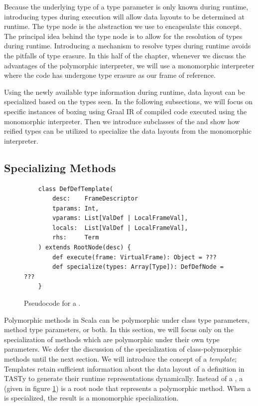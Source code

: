 Because the underlying type of a type parameter is only known during runtime, introducing types during execution will allow data layouts to be determined at runtime.
The type node is the abstraction we use to encapsulate this concept.
The principal idea behind the type node is to allow for the resolution of types during runtime.
Introducing a mechanism to resolve types during runtime avoids the pitfalls of type erasure.
In this half of the chapter, whenever we discuss the advantages of the polymorphic interpreter, we will use a monomorphic interpreter where the code has undergone type erasure as our frame of reference.

Using the newly available type information during runtime, data layout can be specialized based on the types seen.
In the following subsections, we will focus on specific instances of boxing using Graal IR of compiled code executed using the monomorphic interpreter.
Then we introduce subclasses of the  and show how reified types can be utilized to specialize the data layouts from the monomorphic interpreter.

\subsection{Specializing Methods}

\begin{figure}[!htb]
	\begin{verbatim}
	class DefDefTemplate(
		desc:    FrameDescriptor
		tparams: Int, 
		vparams: List[ValDef | LocalFrameVal], 
		locals:  List[ValDef | LocalFrameVal],
		rhs:     Term
	) extends RootNode(desc) {
		def execute(frame: VirtualFrame): Object = ???
		def specialize(types: Array[Type]): DefDefNode = ???
	}
	\end{verbatim}
	\caption{Pseudocode for a .}
	\label{impl:defdeftemplate}
\end{figure}

Polymorphic methods in Scala can be polymorphic under class type parameters, method type parameters, or both. 
In this section, we will focus only on the specialization of methods which are polymorphic under their own type parameters.
We defer the discussion of the specialization of class-polymorphic methods until the next section.
We will introduce the concept of a \textit{template}; Templates retain sufficient information about the data layout of a definition in TASTy to generate their runtime representations dynamically.
Instead of a , a  (given in figure \ref{impl:defdeftemplate}) is a root node that represents a polymorphic method. 
When a  is specialized, the result is a monomorphic  specialization.

